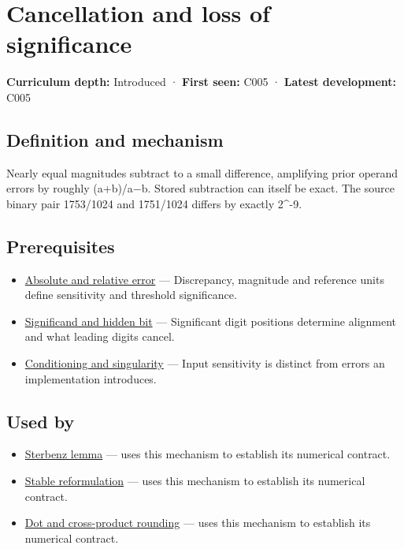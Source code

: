 \hypertarget{appendix-a2773a6a2f9d}{}\label{referencestart:appendix-a2773a6a2f9d}
\section{Cancellation and loss of significance}\label{appendix-a2773a6a2f9d-cancellation-and-loss-of-significance}

\textbf{Curriculum depth:} Introduced · \textbf{First seen:} C005 · \textbf{Latest development:} C005

\subsection{Definition and mechanism}\label{appendix-a2773a6a2f9d-definition-and-mechanism}

Nearly equal magnitudes subtract to a small difference, amplifying prior operand errors by roughly (\textbar a\textbar+\textbar b\textbar)/\textbar a−b\textbar. Stored subtraction can itself be exact. The source binary pair 1753/1024 and 1751/1024 differs by exactly 2\^{}-9.

\subsection{Prerequisites}\label{appendix-a2773a6a2f9d-prerequisites}

\begin{itemize}
\tightlist
\item
  \hyperref[appendix-3ae74e89b4e6]{Absolute and relative error} --- Discrepancy, magnitude and reference units define sensitivity and threshold significance.
\item
  \hyperref[appendix-a24fd710cf67]{Significand and hidden bit} --- Significant digit positions determine alignment and what leading digits cancel.
\item
  \hyperref[appendix-8f6a01f284a7]{Conditioning and singularity} --- Input sensitivity is distinct from errors an implementation introduces.
\end{itemize}

\subsection{Used by}\label{appendix-a2773a6a2f9d-used-by}

\begin{itemize}
\tightlist
\item
  \hyperref[appendix-399b7ad53f39]{Sterbenz lemma} --- uses this mechanism to establish its numerical contract.
\item
  \hyperref[appendix-d7f8ba961670]{Stable reformulation} --- uses this mechanism to establish its numerical contract.
\item
  \hyperref[appendix-5aef4f13483a]{Dot and cross-product rounding} --- uses this mechanism to establish its numerical contract.
\end{itemize}

